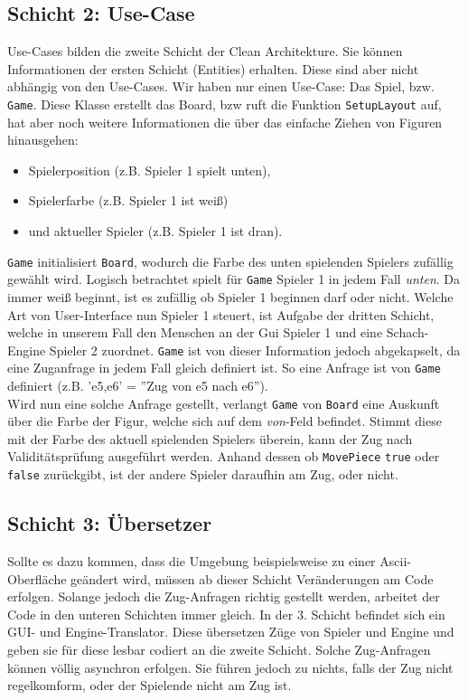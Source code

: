 \documentclass[
10pt, %
a4paper, %
oneside, %
headinclude,footinclude, %
BCOR5mm, %
]{scrartcl}
\begin{document}
\begin{onehalfspace}
\subsection{Schicht 2: Use-Case}
Use-Cases bilden die zweite Schicht der Clean Architekture. Sie können Informationen der ersten Schicht (Entities) erhalten. Diese sind aber nicht abhängig von den Use-Cases.
Wir haben nur einen Use-Case: Das Spiel, bzw. \texttt{Game}. Diese Klasse erstellt das Board, bzw ruft die Funktion \texttt{SetupLayout} auf, hat aber noch weitere Informationen die über das einfache Ziehen von Figuren hinausgehen:
\begin{center}
	\begin{itemize}
		\item Spielerposition (z.B. Spieler 1 spielt unten),
		\item Spielerfarbe (z.B. Spieler 1 ist weiß)
		\item und aktueller Spieler (z.B. Spieler 1 ist dran).
	\end{itemize}
\end{center}
\texttt{Game} initialisiert \texttt{Board}, wodurch die Farbe des unten spielenden Spielers zufällig gewählt wird. Logisch betrachtet spielt für \texttt{Game} Spieler 1 in jedem Fall \textit{unten}. Da immer weiß beginnt, ist es zufällig ob Spieler 1 beginnen darf oder nicht. Welche Art von User-Interface nun Spieler 1 steuert, ist Aufgabe der dritten Schicht, welche in unserem Fall den Menschen an der Gui Spieler 1 und eine Schach-Engine Spieler 2 zuordnet. \texttt{Game} ist von dieser Information jedoch abgekapselt, da eine Zuganfrage in jedem Fall gleich definiert ist.
So eine Anfrage ist von \texttt{Game} definiert (z.B. 'e5,e6' = ''Zug von e5 nach e6''). \\
Wird nun eine solche Anfrage gestellt, verlangt \texttt{Game} von \texttt{Board} eine Auskunft über die Farbe der Figur, welche sich auf dem \textit{von}-Feld befindet. Stimmt diese mit der Farbe des aktuell spielenden Spielers überein, kann der Zug nach Validitätsprüfung ausgeführt werden. Anhand dessen ob \texttt{MovePiece} \texttt{true} oder \texttt{false} zurückgibt, ist der andere Spieler daraufhin am Zug, oder nicht.
\subsection{Schicht 3: Übersetzer}
Sollte es dazu kommen, dass die Umgebung beispielsweise zu einer Ascii-Oberfläche geändert wird, müssen ab dieser Schicht Veränderungen am Code erfolgen. Solange jedoch die Zug-Anfragen richtig gestellt werden, arbeitet der Code in den unteren Schichten immer gleich. In der 3. Schicht befindet sich ein GUI- und Engine-Translator. Diese übersetzen Züge von Spieler und Engine und geben sie für diese lesbar codiert an die zweite Schicht. 
Solche Zug-Anfragen können völlig asynchron erfolgen. Sie führen jedoch zu nichts, falls der Zug nicht regelkomform, oder der Spielende nicht am Zug ist.

\end{onehalfspace}
\end{document}
